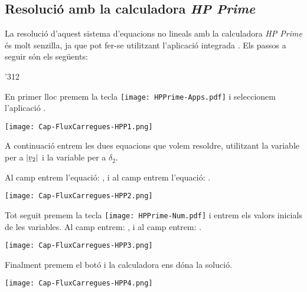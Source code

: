 \hspace{1cm}

\hspace{1cm}

\hspace{1cm}

\subsection{Resolució amb la calculadora \emph{HP Prime}}

La resolució d'aquest sistema d'equacions no lineals amb la calculadora \emph{HP Prime} és molt senzilla, ja que pot fer-se utilitzant l'aplicació integrada . Els passos a seguir són els següents:

\begin{dingautolist}{'312}

    \item En primer lloc premem la tecla \texttt{[image: HPPrime-Apps.pdf]} i seleccionem l'aplicació .

         \texttt{[image: Cap-FluxCarregues-HPP1.png]}

    \item A continuació entrem les dues equacions que volem resoldre, utilitzant la variable  per a $|\cmplx{v}_2|$ i la variable  per a $\delta_2$.

        Al camp  entrem l'equació: , i al camp  entrem l'equació: .

        \texttt{[image: Cap-FluxCarregues-HPP2.png]}

    \item Tot seguit premem la tecla \texttt{[image: HPPrime-Num.pdf]} i entrem els valors inicials de les variables. Al camp  entrem: , i al camp  entrem: .

        \texttt{[image: Cap-FluxCarregues-HPP3.png]}

    \item  Finalment premem el botó  i la calculadora ens dóna  la solució.

        \texttt{[image: Cap-FluxCarregues-HPP4.png]}

\end{dingautolist}
